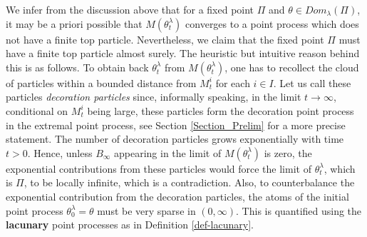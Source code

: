 \documentclass[a4paper,reqno]{amsart}%
\newcommand{\1}{\mathbf 1}
\theoremstyle{mine}
\numberwithin{theorem}{section}
\numberwithin{equation}{section}
\theoremstyle{remark}
\begin{document}
We infer from the discussion above that for a fixed point $\Pi$ and $\theta \in Dom_{\lambda}(\Pi)$, it may be a priori possible that $M(\theta_t^\lambda)$ converges to a point process which does not have a finite top particle. Nevertheless, we claim that the fixed point $\Pi$ must have a finite top particle almost surely. The heuristic but intuitive reason behind this is as follows. To obtain back $\theta_t^\lambda$ from $M(\theta_t^\lambda)$, one has to recollect the cloud of particles within a bounded distance from $M_t^i$ for each $i\in I$. Let us call these particles \textit{decoration particles} since, informally speaking, in the limit $t\to \infty$, conditional on $M_t^i$ being large, these particles form the decoration point process in the extremal point process, see Section \ref{Section_Prelim} for a more precise statement. The number of decoration particles grows exponentially with time $t >0$. Hence, unless $B_\infty$ appearing in the limit of $M(\theta_t^\lambda)$ is zero, the exponential contributions from these particles would force the limit of $\theta_t^\lambda$, which is $\Pi$, to be locally infinite, which is a contradiction. Also, to counterbalance the exponential contribution from the decoration particles, the atoms of the initial point process $\theta_0^\lambda = \theta$ must be very sparse in $(0,\infty)$. This is quantified using the \textbf{lacunary} point processes as in Definition \ref{def-lacunary}. \\
\end{document}

